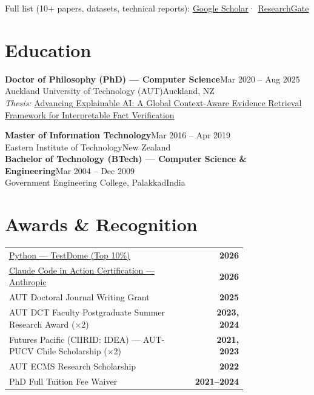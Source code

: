 \documentclass[10.5pt,a4paper]{article}
\newcommand{\edu}[4]{%
  {\bfseries #1}\hfill{\small\color{accent}#2}\\[-1pt]
  {\small\color{mid}#3}\hfill{\small\color{light}#4}\\[2pt]%
}
\begin{document}
{\small\color{light}Full list (10+ papers, datasets, technical reports):
\href{https://scholar.google.com/citations?user=6xGoEsMAAAAJ}{Google Scholar}\enspace·\enspace
\href{https://www.researchgate.net/profile/Manju-Vallayil-2}{ResearchGate}}

\section{Education}

\edu{Doctor of Philosophy (PhD) — Computer Science}
    {Mar 2020 – Aug 2025}
    {Auckland University of Technology (AUT)}
    {Auckland, NZ}
{\small\textit{Thesis:} \href{https://openrepository.aut.ac.nz/items/33de7437-821c-4a19-8539-0d38c6848d04}{Advancing Explainable AI: A Global Context-Aware Evidence Retrieval Framework for Interpretable Fact Verification}}

\vspace{6pt}

\edu{Master of Information Technology}
    {Mar 2016 – Apr 2019}
    {Eastern Institute of Technology}
    {New Zealand}

\edu{Bachelor of Technology (BTech) — Computer Science \& Engineering}
    {Mar 2004 – Dec 2009}
    {Government Engineering College, Palakkad}
    {India}

\section{Awards \& Recognition}

\renewcommand{\arraystretch}{1.4}
\begin{tabular}{@{}p{0.78\linewidth}r@{}}
  \href{https://www.testdome.com/certificates/9fd52f85ece34b29bba43800c2918dbd}{Python — TestDome {\small(Top 10\%)}}
    & \textcolor{accent}{\small\bfseries 2026} \\
  \href{https://verify.skilljar.com/c/ngmh5b4cn9um}{Claude Code in Action Certification — Anthropic}
    & \textcolor{accent}{\small\bfseries 2026} \\
  AUT Doctoral Journal Writing Grant
    & \textcolor{accent}{\small\bfseries 2025} \\
  AUT DCT Faculty Postgraduate Summer Research Award {\small(×2)}
    & \textcolor{accent}{\small\bfseries 2023, 2024} \\
  Futures Pacific (CIIRID: IDEA) — AUT-PUCV Chile Scholarship {\small(×2)}
    & \textcolor{accent}{\small\bfseries 2021, 2023} \\
  AUT ECMS Research Scholarship
    & \textcolor{accent}{\small\bfseries 2022} \\
  PhD Full Tuition Fee Waiver
    & \textcolor{accent}{\small\bfseries 2021--2024} \\
\end{tabular}
\end{document}
